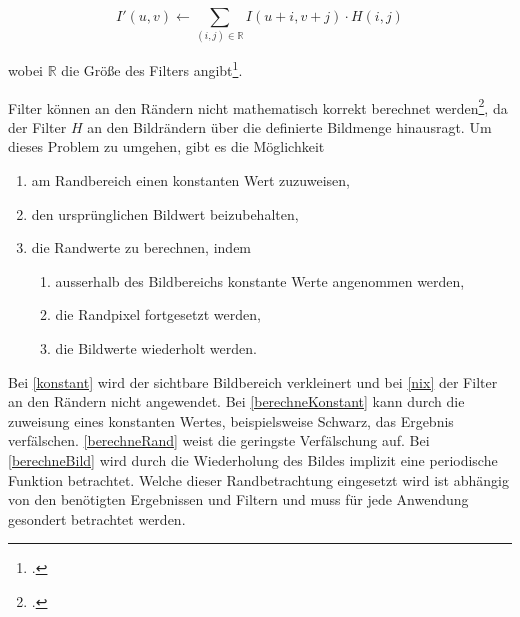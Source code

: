 \begin{equation}
	I'\left(u,v\right) \gets
	\sum_{\left(i,j\right)\in\mathbb{R}} I\left(u + i, v + j\right) \cdot H\left(i,j\right)
\end{equation}

wobei $\mathbb{R}$ die Größe des Filters angibt\footcite[Vgl.][S.~92--93]{burger05}.

Filter können an den Rändern nicht mathematisch korrekt berechnet werden\footcite[Vgl.][S.~113]{burger05}, da der Filter $H$ an den Bildrändern über die definierte Bildmenge hinausragt. Um dieses Problem zu umgehen, gibt es die Möglichkeit

\begin{enumerate}
	\item am Randbereich einen konstanten Wert zuzuweisen,\label{konstant}
	\item den ursprünglichen Bildwert beizubehalten,\label{nix}
	\item die Randwerte zu berechnen, indem
	\begin{enumerate}
		\item ausserhalb des Bildbereichs konstante Werte angenommen werden,\label{berechneKonstant}
		\item die Randpixel fortgesetzt werden,\label{berechneRand}
		\item die Bildwerte wiederholt werden.\label{berechneBild}
	\end{enumerate}
\end{enumerate}

Bei \autoref{konstant} wird der sichtbare Bildbereich verkleinert und bei \autoref{nix} der Filter an den Rändern nicht
 angewendet. Bei \autoref{berechneKonstant} kann durch die zuweisung eines konstanten Wertes, beispielsweise Schwarz,
 das Ergebnis verfälschen. \autoref{berechneRand} weist die geringste Verfälschung auf. Bei \autoref{berechneBild} wird
 durch die Wiederholung des Bildes implizit eine periodische Funktion betrachtet. Welche dieser Randbetrachtung
 eingesetzt wird ist abhängig von den benötigten Ergebnissen und Filtern und muss für jede Anwendung gesondert
 betrachtet werden.


